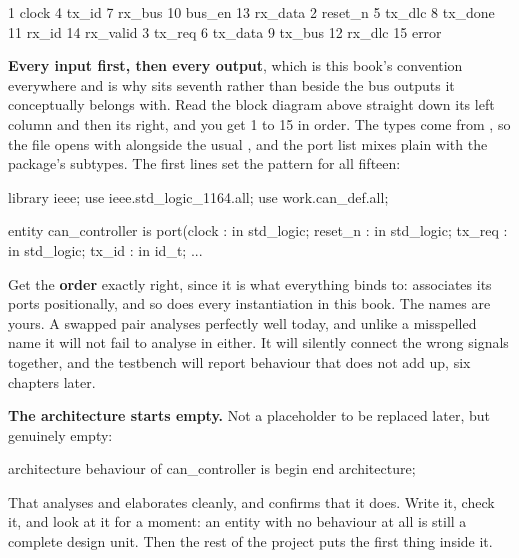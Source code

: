 \begin{textdrawing}
 1 clock       4 tx_id     7 rx_bus     10 bus_en    13 rx_data
 2 reset_n     5 tx_dlc    8 tx_done    11 rx_id     14 rx_valid
 3 tx_req      6 tx_data   9 tx_bus     12 rx_dlc    15 error
\end{textdrawing}

\textbf{Every input first, then every output}, which is this book's convention everywhere and is why
 sits seventh rather than beside the bus outputs it conceptually belongs with. Read the
block diagram above straight down its left column and then its right, and you get 1 to 15 in order.
The types come from , so the file opens with  alongside the
usual , and the port list mixes plain  with the package's
subtypes. The first lines set the pattern for all fifteen:

\begin{vhdlcode}
library ieee;
use ieee.std_logic_1164.all;
use work.can_def.all;

entity can_controller is
    port(clock   : in std_logic;
         reset_n : in std_logic;
         tx_req  : in std_logic;
         tx_id   : in id_t;
         ...
\end{vhdlcode}

\begin{warning}
Get the \textbf{order} exactly right, since it is what everything binds to: 
associates its ports positionally, and so does every instantiation in this book. The names are yours.
A swapped pair analyses perfectly well today, and unlike a misspelled name it will not fail to
analyse in  either. It will silently connect the wrong signals together, and the
testbench will report behaviour that does not add up, six chapters later.
\end{warning}

\textbf{The architecture starts empty.} Not a placeholder to be replaced later, but genuinely empty:

\begin{vhdlcode}
architecture behaviour of can_controller is
begin
end architecture;
\end{vhdlcode}

That analyses and elaborates cleanly, and  confirms that it does. Write it, check
it, and look at it for a moment: an entity with no behaviour at all is still a complete design unit.
Then the rest of the project puts the first thing inside it.

